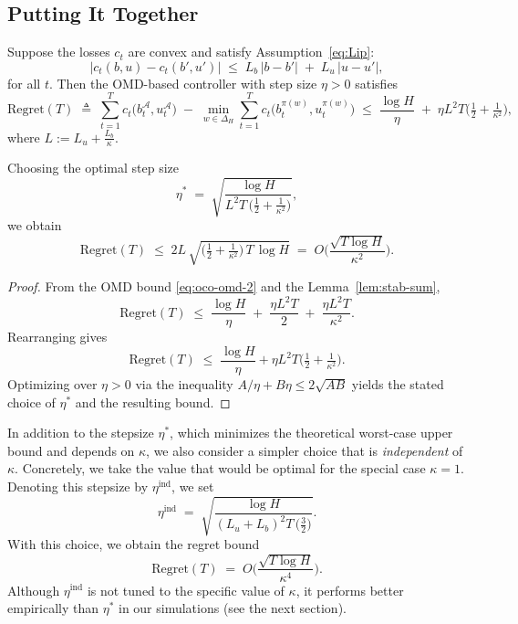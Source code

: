 \subsection{Putting It Together}

\begin{Thm:Theorem}
\label{thm:regret}
Suppose the losses \(c_t\) are convex and satisfy Assumption~\ref{eq:Lip}:
\begin{equation*}
  \big|c_t(b,u) - c_t(b',u')\big|
  \;\leq\;
  L_b \,|b-b'| \;+\; L_u \,|u-u'| ,
\end{equation*}
for all \(t\). Then the OMD-based controller with step size \(\eta>0\) satisfies
\[
  \mathrm{Regret}(T)
  \;\triangleq\;
  \sum_{t=1}^T c_t\big(b_t^\mathcal{A},u_t^\mathcal{A}\big)
  \;-\;
  \min_{w\in\Delta_H}\sum_{t=1}^T c_t\!\big(b_t^{\pi(w)},u_t^{\pi(w)}\big)
  \;\le\;
  \frac{\log H}{\eta} \;+\; \eta L^2 T\Big(\tfrac{1}{2} + \tfrac{1}{\kappa^2}\Big),
\]
where \(L := L_u + \tfrac{L_b}{\kappa}\).

Choosing the optimal step size
\[
  \eta^*
  \;=\;
  \sqrt{\frac{\log H}{L^2 T \,\big(\tfrac{1}{2}+\tfrac{1}{\kappa^2}\big)}},
\]
we obtain
\[
  \mathrm{Regret}(T)
  \;\le\;
  2L\,\sqrt{\Big(\tfrac{1}{2}+\tfrac{1}{\kappa^2}\Big)\,T\,\log H}
  \;=\;
  O\!\Big(
  \frac{\sqrt{T\log H}}{\kappa^2}
  \Big).
\]
\end{Thm:Theorem}


\begin{proof}
From the OMD bound \eqref{eq:oco-omd-2} and the Lemma~\ref{lem:stab-sum},
\[
\mathrm{Regret}(T)
\;\le\;
\frac{\log H}{\eta}
\;+\;
\frac{\eta L^2 T}{2}
\;+\;
\frac{\eta L^2 T}{\kappa^2}.
\]
Rearranging gives
\[
\mathrm{Regret}(T)
\;\le\;
\frac{\log H}{\eta} + \eta L^2 T\Big(\tfrac{1}{2}+\tfrac{1}{\kappa^2}\Big).
\]
Optimizing over \(\eta > 0\) via the inequality \(A/\eta + B\eta \le 2\sqrt{AB}\) yields the stated choice of \(\eta^*\) and the resulting bound.
\end{proof}

In addition to the stepsize \(\eta^*\), which minimizes the theoretical worst-case upper bound and depends on \(\kappa\), we also consider a simpler choice that is \emph{independent} of \(\kappa\). Concretely, we take the value that would be optimal for the special case \(\kappa = 1\). Denoting this stepsize by \(\eta^{\mathrm{ind}}\), we set
\[
  \eta^{\mathrm{ind}}
  \;=\;
  \sqrt{\frac{\log H}{(L_u+L_b)^2 T \,\big(\tfrac{3}{2}\big)}}.
\]
With this choice, we obtain the regret bound
\[
  \mathrm{Regret}(T)
  \;=\;
  O\!\Big(
    \frac{\sqrt{T \log H}}{\kappa^4}
  \Big).
\]
Although \(\eta^{\mathrm{ind}}\) is not tuned to the specific value of \(\kappa\), it performs better empirically than \(\eta^*\) in our simulations (see the next section).




